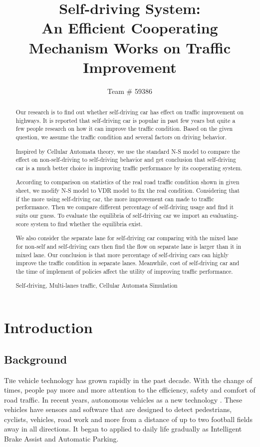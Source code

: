 \documentclass{mcmthesis}
\title{Self-driving System:\\ An Efficient Cooperating Mechanism Works on Traffic Improvement}
\author{Team \# 59386}
\date{}
\numberwithin{equation}{section}
\newcommand{\scite}[1]{\textsuperscript{\cite{#1}}}%
\begin{document}
	\begin{abstract}
		\noindent Our research is to find out whether self-driving car has effect on traffic improvement on highways. It is reported that self-driving car is popular in past few years but quite a few people research on how it can improve the traffic condition. Based on the given question, we assume the traffic condition and several factors on driving behavior.

		\noindent Inspired by Cellular Automata theory, we use the standard N-S model to compare the effect on non-self-driving to self-driving behavior and get conclusion that self-driving car is a much better choice in improving traffic performance by its cooperating system. 

		\noindent According to comparison on statistics of the real road traffic condition shown in given sheet, we modify N-S model to VDR model to fix the real condition. Considering that if the more using self-driving car, the more improvement can made to traffic performance. Then we compare different percentage of self-driving usage and find it suits our guess. To evaluate the equilibria of self-driving car we import an evaluating-score system to find whether the equilibria exist.

		\noindent We also consider the separate lane for self-driving car comparing with the mixed lane for non-self and self-driving cars then find the flow on separate lane is larger than it in mixed lane. Our conclusion is that more percentage of self-driving cars can highly improve the traffic condition in separate lanes. Meanwhile, cost of self-driving car and the time of implement of policies affect the utility of improving traffic performance.
		\begin{keywords}
			Self-driving, Multi-lanes traffic, Cellular Automata Simulation
		\end{keywords}
	\end{abstract}
	\maketitle
	\restoregeometry
	
	\tableofcontents

	\newpage
	\section{Introduction}

		\subsection{Background}
			\lettrine[lines=2]{T}he vehicle technology has grown rapidly in the past decade. With the change of times, people pay more and more attention to the efficiency, safety and comfort of road traffic. In recent years, autonomous vehicles as a new technology . These vehicles have sensors and software that are designed to detect pedestrians, cyclists, vehicles, road work and more from a distance of up to two football fields away in all directions\scite{1}. It began to applied to daily life gradually as Intelligent Brake Assist and Automatic Parking.
\end{document}
